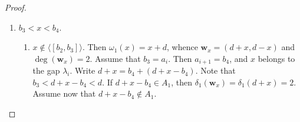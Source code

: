 \documentclass[11pt]{article}
\def\deg{\operatorname{deg}}
\def\wbf{{\mathbf w}}
\theoremstyle{remark}
\theoremstyle{definition}
\begin{document}
\begin{proof}
\begin{enumerate}
\begin{enumerate}[\((\text{a}1)\)]
 From (\ref{EBd21}) and (\ref{EBd22}) we get
  \begin{equation}\label{EBd23} 
  D(x)  \leq \left\lceil \frac{a_{i+1} - x}{\epsilon'} \right\rceil +  \left\lfloor \frac{x-b_4 - a_i}{\epsilon'} \right\rfloor \leq \left\lceil \frac{\lambda_i -3 }{\epsilon'} \right\rceil  \leq 1 + \left\lfloor \frac{\lambda_i  -4}{\epsilon'} \right\rfloor \leq M+1.
   \end{equation}
      \item $a_j < x-b_4 < a_{j+1}$ for some $j<i$, that is $x$ and $x-b_4$ belong to two different gaps of $A_1$. Using $x= b_4 + x-b_4 = (b_4 + b^{''}_2) + a_j +  \left\lfloor \frac{x-b_4 - a_j}{b_2} \right\rfloor b_2$, where $0\leq b^{''}_2 < b_2$, we get
  \begin{equation}\label{EBd24}
  \delta_1(\wbf_x) = \delta_1(x) \leq 2 + \left\lfloor \frac{x-b_4 - a_j}{b_2} \right\rfloor \leq 2 + \left\lfloor \frac{a_{j+1} - 1 - a_j}{b_2} \right\rfloor \leq 2+ \left\lfloor \frac{\lambda_j}{b_2} \right\rfloor.
   \end{equation}
   From (\ref{EBd21}) we also have $\delta_2(\wbf_x) \leq 1 + \left\lceil \frac{ \lambda_i}{d-b_{2r}} \right\rceil$. Hence,
    \begin{equation}\label{EBd25}
  D(x)  \leq \left\lceil \frac{ \lambda_i}{d-b_{2r}} \right\rceil + \left\lfloor \frac{\lambda_j}{b_2} \right\rfloor \leq 1+  \left\lfloor \frac{ \lambda_i}{d-b_{2r}} \right\rfloor + \left\lfloor \frac{\lambda_j}{b_2} \right\rfloor.
     \end{equation}
   Note that if $\lambda_k\ge \lambda_l$ are two different gaps, then $\lambda_k \leq \lambda_{\max}$ and $\lambda_l \leq \lambda_{\mathrm{sl}}$. This implies
   $\left\lfloor \frac{ \lambda_i}{d-b_{2r}} \right\rfloor + \left\lfloor \frac{\lambda_j}{b_2} \right\rfloor \leq  M.$ Using this remark, from (\ref{EBd23}) and (\ref{EBd25}) we get in Case $a$ that $ D(x) \leq  M +1$.
  \end{enumerate}
     \item $ b_3 < x< b_4$.
     \begin{enumerate}[\((\text{b}1)\)]
         \item $x\not\in \langle [b_2,b_3]\rangle$. Then $\omega_1(x) = x+d$, whence $\wbf_x = (d+x, d-x)$ and $\deg(\wbf_x) = 2$. Assume that $b_3 = a_i$. Then $a_{i+1} = b_4$, and $x$ belongs to the gap $\lambda_i$. Write $d+x = b_4 + (d+x-b_4)$. Note that $b_3 <  d+x - b_4 < d$. If $d+x-b_4 \in A_1$, then $ \delta_1(\wbf_x) = \delta_1(d+ x)  =2$. Assume now that $d+x-b_4\not\in A_1$.
  

\end{enumerate}
\end{enumerate}
\end{proof}
\end{document}
